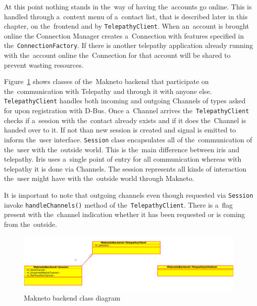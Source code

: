 At this point nothing stands in the~way of having the~accounts go online. This is handled through a~context menu of a~contact list, that is described later in this chapter, on the~frontend and by \verb|TelepathyClient|. When an~account is brought online the Connection Manager creates a~Connection with features specified in the~\verb|ConnectionFactory|. If there is another telepathy application already running with the~account online the~Connection for that account will be shared to prevent wasting resources. 

Figure~\ref{fig:MaknetoBackendClassDiag} shows classes of the~Makneto backend that participate on the~communication with Telepathy and through it with anyone else. \verb|TelepathyClient| handles both incoming and outgoing  Channels of types asked for upon registration with D-Bus. Once a~Channel arrives the~\verb|TelepathyClient| checks if a~session with the~contact already exists and if it does the~Channel is handed over to it. If not than new session is created and signal is emitted to inform the~user interface. \verb|Session| class encapsulates all of the~communication of the~user with the~outside world. This is the~main difference between iris and telepathy. Iris uses a~single point of entry for all communication whereas with telepathy it is done via Channels. The session represents all kinds of interaction the~user might have with the~outside world through Makneto. 

It is important to note that outgoing channels even though requested via \verb|Session| invoke \verb|handleChannels()| method of the~\verb|TelepathyClient|. There is a~flag present with the~channel indication whether it has been requested or is coming from the~outside. 

\begin{figure}[ht]
	\begin{center}
	\includegraphics[width=15cm]{fig/makneto-backend-class-diag.pdf}
	\caption{Makneto backend class diagram}
	\label{fig:MaknetoBackendClassDiag}
\end{center}
\end{figure}


